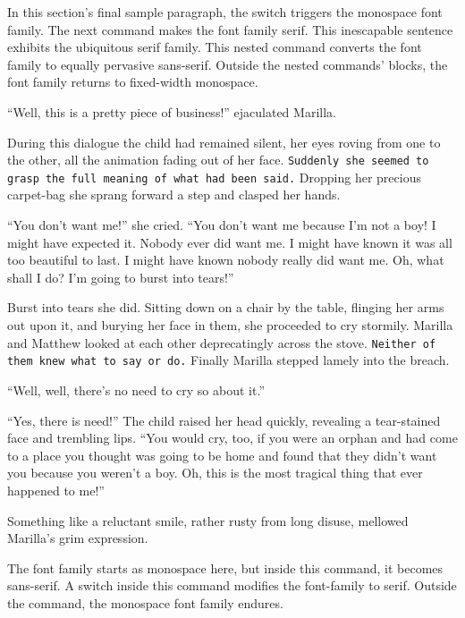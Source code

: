 \documentclass[a4paper]{article}
\begin{document}
In this section's final sample paragraph, \ttfamily the switch triggers the monospace font family. The next command makes the font family serif. \textrm{This inescapable sentence exhibits the ubiquitous serif family. \textsf{This nested command converts the font family to equally pervasive sans-serif.}} Outside the nested commands' blocks, the font family returns to fixed-width monospace.

\sffamily``Well, this is a pretty piece of business!'' ejaculated Marilla.

\textrm{During this dialogue the child had remained silent, her eyes roving from one to the other, all the animation fading out of her face. \texttt{Suddenly she seemed to grasp the full meaning of what had been said.} Dropping her precious carpet-bag she sprang forward a step and clasped her hands.}

``You don't want me!'' she cried. ``You don't want me because I'm not a boy! I might have expected it. Nobody ever did want me. I might have known it was all too beautiful to last. I might have known nobody really did want me. \rmfamily Oh, what shall I do? I'm going to burst into tears!''

Burst into tears she did. \textsf{Sitting down on a chair by the table, flinging her arms out upon it, and burying her face in them, she proceeded to cry stormily.} Marilla and Matthew looked at each other deprecatingly across the stove. \texttt{Neither of them knew what to say or do.} Finally Marilla stepped lamely into the breach.

``Well, well, there's no need to cry so about it.''

``Yes, there is need!'' \ttfamily The child raised her head quickly, revealing a tear-stained face and trembling lips. \textrm{``You would cry, too, if you were an orphan and had come to a place you thought was going to be home and found that they didn't want you because you weren't a boy. \textsf{Oh, this is the most tragical thing that ever happened to me!''}}

Something like a reluctant smile, rather rusty from long disuse, mellowed Marilla's grim expression.

The font family starts as monospace here, \textsf{but inside this command, it becomes sans-serif. \rmfamily A switch inside this command modifies the font-family to serif.} Outside the command, the monospace font family endures.
\end{document}
